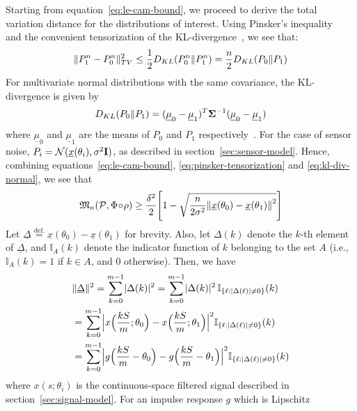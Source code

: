 \documentclass[conference]{IEEEtran}
\providecommand{\v}{}
\renewcommand{\v}[1]{\underline{#1}}
\providecommand{\m}{}
\renewcommand{\m}[1]{{\bf #1}}
\DeclarePairedDelimiter\abs{\lvert}{\rvert}
\DeclarePairedDelimiter\norm{\lVert}{\rVert}
\newcommand{\Phiorho}{\Phi\!\circ\!\rho}
\begin{document}
\begin{IEEEproof}
Starting from equation~\eqref{eq:le-cam-bound}, we proceed to derive the total
variation distance for the distributions of interest. Using Pinsker's
inequality~\cite{Kullback1967Lower} and the convenient tensorization of the
KL-divergence~\cite{Duchi2015Information}, we see that:
\begin{equation} \label{eq:pinsker-tensorization}
	\norm{P_1^n - P_0^n}_{TV}^2 \leq \frac{1}{2} D_{KL}(P_0^n \Vert P_1^n) = \frac{n}{2} D_{KL}(P_0 \Vert P_1)
\end{equation}
For multivariate normal distributions with the same covariance, the
KL-divergence is given by
\begin{equation} \label{eq:kl-div-normal}
	D_{KL}(P_0 \Vert P_1) = (\v \mu_0 - \v \mu_1)^T \m \Sigma^{-1} (\v \mu_0 - \v \mu_1)
\end{equation}
where $\v \mu_0$ and $\v \mu_1$ are the means of $P_0$ and $P_1$
respectively~\cite{DuchiDerivation}. For the case of sensor noise, $P_i =
\mathcal{N}(\v x(\theta_i), \sigma^2 \m I)$, as described in
section~\ref{sec:sensor-model}. Hence, combining
equations~\eqref{eq:le-cam-bound}, \eqref{eq:pinsker-tensorization} and
\eqref{eq:kl-div-normal}, we see that
\begin{equation} \label{eq:lb-after-pinsker}
	\mathfrak{M}_n(\mathcal{P}, \Phiorho) \geq \frac{\delta^2}{2} \Bigg[ 1 - \sqrt{ \frac{n}{2\sigma^2} \norm*{\v x(\theta_0) - \v x(\theta_1)}^2 } \Bigg]
\end{equation}
Let $\v \Delta \overset{\text{def.}}{=} \v x(\theta_0) - \v x(\theta_1)$ for
brevity. Also, let $\Delta(k)$ denote the $k$-th element of $\v\Delta$, and
$\mathbb I_A(k)$ denote the indicator function of $k$ belonging to the set $A$
(i.e., $\mathbb I_A(k) = 1$ if $k \in A$, and $0$ otherwise). Then, we have
\begin{align}
	&\norm{\v\Delta}^2 = \sum_{k=0}^{m-1} \abs{\Delta(k)}^2 = \sum_{k=0}^{m-1} \abs{\Delta(k)}^2 \, \mathbb I_{\{\ell: \abs{\Delta(\ell)} \neq 0\}}(k) \\
	&= \sum_{k=0}^{m-1} \abs[\Big]{x\Big(\frac{kS}{m}; \theta_0\Big) - x\Big(\frac{kS}{m}; \theta_1\Big)}^2 \mathbb I_{\{\ell: \abs{\Delta(\ell)} \neq 0\}}(k) \\
	&= \sum_{k=0}^{m-1} \abs[\Big]{g\Big(\frac{kS}{m} - \theta_0\Big) - g\Big(\frac{kS}{m} - \theta_1\Big)}^2 \mathbb I_{\{\ell: \abs{\Delta(\ell)} \neq 0\}}(k)
\end{align}
where $x(s;\theta_i)$ is the continuous-space filtered signal described in
section~\ref{sec:signal-model}. For an impulse response $g$ which is Lipschitz

\end{IEEEproof}
\end{document}

